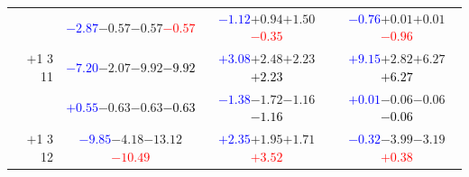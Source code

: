 \documentclass[compress]{beamer}
\begin{document}
\begin{frame}
\begin{tabular}{r | c | c | c}
          & \textcolor{blue}{$-2.87$}\hspace{0.1 cm}$-0.57$\hspace{0.1 cm}$-0.57$\hspace{0.1 cm}\textcolor{red}{$-0.57$} & \textcolor{blue}{$-1.12$}\hspace{0.1 cm}$+0.94$\hspace{0.1 cm}$+1.50$\hspace{0.1 cm}\textcolor{red}{$-0.35$} & \textcolor{blue}{$-0.76$}\hspace{0.1 cm}$+0.01$\hspace{0.1 cm}$+0.01$\hspace{0.1 cm}\textcolor{red}{$-0.96$} \\
$+$1 3 11 & \textcolor{blue}{$-7.20$}\hspace{0.1 cm}$-2.07$\hspace{0.1 cm}$-9.92$\hspace{0.1 cm}\textcolor{black}{$-9.92$} & \textcolor{blue}{$+3.08$}\hspace{0.1 cm}$+2.48$\hspace{0.1 cm}$+2.23$\hspace{0.1 cm}\textcolor{black}{$+2.23$} & \textcolor{blue}{$+9.15$}\hspace{0.1 cm}$+2.82$\hspace{0.1 cm}$+6.27$\hspace{0.1 cm}\textcolor{black}{$+6.27$} \\
          & \textcolor{blue}{$+0.55$}\hspace{0.1 cm}$-0.63$\hspace{0.1 cm}$-0.63$\hspace{0.1 cm}\textcolor{black}{$-0.63$} & \textcolor{blue}{$-1.38$}\hspace{0.1 cm}$-1.72$\hspace{0.1 cm}$-1.16$\hspace{0.1 cm}\textcolor{black}{$-1.16$} & \textcolor{blue}{$+0.01$}\hspace{0.1 cm}$-0.06$\hspace{0.1 cm}$-0.06$\hspace{0.1 cm}\textcolor{black}{$-0.06$} \\
$+$1 3 12 & \textcolor{blue}{$-9.85$}\hspace{0.1 cm}$-4.18$\hspace{0.1 cm}$-13.12$\hspace{0.1 cm}\textcolor{red}{$-10.49$} & \textcolor{blue}{$+2.35$}\hspace{0.1 cm}$+1.95$\hspace{0.1 cm}$+1.71$\hspace{0.1 cm}\textcolor{red}{$+3.52$} & \textcolor{blue}{$-0.32$}\hspace{0.1 cm}$-3.99$\hspace{0.1 cm}$-3.19$\hspace{0.1 cm}\textcolor{red}{$+0.38$} \\

\end{tabular}
\end{frame}
\end{document}
